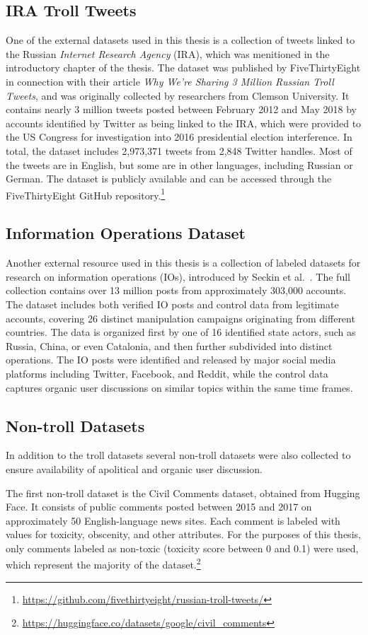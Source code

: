 \documentclass[twoside]{ctuthesis}
\theoremstyle{plain}
\theoremstyle{definition}
\theoremstyle{note}
\begin{document}
\subsection{IRA Troll Tweets}
One of the external datasets used in this thesis is a collection of tweets linked to the Russian \textit{Internet Research Agency} (IRA), which was menitioned in the introductory chapter of the thesis. The dataset was published by FiveThirtyEight in connection with their article \textit{Why We're Sharing 3 Million Russian Troll Tweets}, and was originally collected by researchers from Clemson University. It contains nearly 3 million tweets posted between February 2012 and May 2018 by accounts identified by Twitter as being linked to the IRA, which were provided to the US Congress for investigation into 2016 presidential election interference. In total, the dataset includes 2,973,371 tweets from 2,848 Twitter handles. Most of the tweets are in English, but some are in other languages, including Russian or German. The dataset is publicly available and can be accessed through the FiveThirtyEight GitHub repository.\footnote{\url{https://github.com/fivethirtyeight/russian-troll-tweets/}}

\subsection{Information Operations Dataset}
Another external resource used in this thesis is a collection of labeled datasets for research on information operations (IOs), introduced by Seckin et al.~\cite{Seckin2024}. The full collection contains over 13 million posts from approximately 303,000 accounts. The dataset includes both verified IO posts and control data from legitimate accounts, covering 26 distinct manipulation campaigns originating from different countries. The data is organized first by one of 16 identified state actors, such as Russia, China, or even Catalonia, and then further subdivided into distinct operations. The IO posts were identified and released by major social media platforms including Twitter, Facebook, and Reddit, while the control data captures organic user discussions on similar topics within the same time frames.

\subsection{Non-troll Datasets}
In addition to the troll datasets several non-troll datasets were also collected to ensure availability of apolitical and organic user discussion.\par
The first non-troll dataset is the Civil Comments dataset, obtained from Hugging Face. It consists of public comments posted between 2015 and 2017 on approximately 50 English-language news sites. Each comment is labeled with values for toxicity, obscenity, and other attributes. For the purposes of this thesis, only comments labeled as non-toxic (toxicity score between 0 and 0.1) were used, which represent the majority of the dataset.\footnote{\url{https://huggingface.co/datasets/google/civil_comments}}\par
\end{document}

